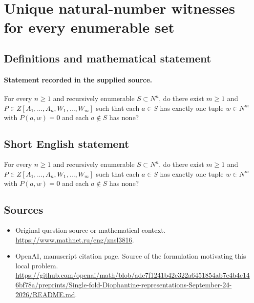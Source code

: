 \documentclass[11pt]{article}
\begin{document}
\section*{Unique natural-number witnesses for every enumerable set}\label{statement}
\subsection{Definitions and mathematical statement}
\paragraph{Statement recorded in the supplied source.}
For every $n\geq 1$ and recursively enumerable $S\subset N^{n}$, do there exist $m\geq 1$ and $P\in Z[A_{1},\dots ,A_{n},W_{1},\dots ,W_m]$ such that each $a\in S$ has exactly one tuple $w\in N^m$ with $P(a,w)=0$ and each $a\notin S$ has none?
\subsection{Short English statement}
For every $n\geq 1$ and recursively enumerable $S\subset N^{n}$, do there exist $m\geq 1$ and $P\in Z[A_{1},\dots ,A_{n},W_{1},\dots ,W_m]$ such that each $a\in S$ has exactly one tuple $w\in N^m$ with $P(a,w)=0$ and each $a\notin S$ has none?
\subsection{Sources}
\begin{itemize}
\item[S1] Original question source or mathematical context.
\url{https://www.mathnet.ru/eng/znsl3816}.
\item[S2] OpenAI, manuscript citation page. Source of the formulation motivating this local problem.
\url{https://github.com/openai/math/blob/adc7f1241b42e322a6451854ab7e4b4c146bf78a/preprints/Single-fold-Diophantine-representations-September-24-2026/README.md}.
\end{itemize}
\end{document}
